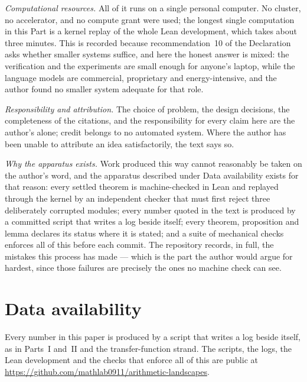 \documentclass[11pt,a4paper]{article}
\theoremstyle{plain}
\theoremstyle{definition}
\theoremstyle{remark}
\begin{document}
\emph{Computational resources.} All of it runs on a single personal computer. No cluster, no
accelerator, and no compute grant were used; the longest single computation in this Part is a
kernel replay of the whole Lean development, which takes about three minutes. This is recorded
because recommendation~10 of the Declaration asks whether smaller systems suffice, and here the
honest answer is mixed: the verification and the experiments are small enough for anyone's
laptop, while the language models are commercial, proprietary and energy-intensive, and the
author found no smaller system adequate for that role.

\emph{Responsibility and attribution.} The choice of problem, the design decisions, the
completeness of the citations, and the responsibility for every claim here are the author's
alone; credit belongs to no automated system. Where the author has been unable to attribute an
idea satisfactorily, the text says so.

\emph{Why the apparatus exists.} Work produced this way cannot reasonably be taken on the
author's word, and the apparatus described under Data availability exists for that reason:
every settled theorem is machine-checked in Lean and replayed through the kernel by an
independent checker that must first reject three deliberately corrupted modules; every number
quoted in the text is produced by a committed script that writes a log beside itself; every
theorem, proposition and lemma declares its status where it is stated; and a suite of
mechanical checks enforces all of this before each commit. The repository records, in full, the
mistakes this process has made --- which is the part the author would argue for hardest, since
those failures are precisely the ones no machine check can see.

\section*{Data availability}
Every number in this paper is produced by a script that writes a log beside itself, as in
Parts~I and~II and the transfer-function strand. The scripts, the logs, the Lean development and the checks that enforce all of
this are public at \url{https://github.com/mathlab0911/arithmetic-landscapes}.
\end{document}
